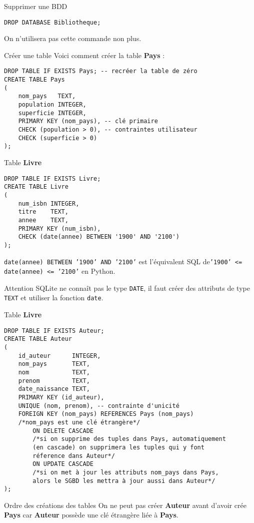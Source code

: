 \documentclass[10pt]{nsibeamer}
\begin{document}
\begin{frame}[fragile]{Supprimer une BDD}
    
    \begin{verbatim}
DROP DATABASE Bibliotheque;
	\end{verbatim}
    \pause
    On n'utilisera pas cette commande non plus.
\end{frame}

\begin{frame}[fragile]{Créer une table}
    Voici comment créer la table \textbf{Pays} :
    
    \begin{verbatim}
DROP TABLE IF EXISTS Pays; -- recréer la table de zéro
CREATE TABLE Pays
(
    nom_pays   TEXT,
    population INTEGER,
    superficie INTEGER,
    PRIMARY KEY (nom_pays), -- clé primaire
    CHECK (population > 0), -- contraintes utilisateur
    CHECK (superficie > 0)
);
\end{verbatim}
    
\end{frame}

\begin{frame}[fragile]{Table \textbf{Livre}}
    
    
    \begin{verbatim}
DROP TABLE IF EXISTS Livre;
CREATE TABLE Livre
(
    num_isbn INTEGER,
    titre    TEXT,
    annee    TEXT,
    PRIMARY KEY (num_isbn),
    CHECK (date(annee) BETWEEN '1900' AND '2100')
);
\end{verbatim}
    \pause
    \texttt{date(annee) BETWEEN '1900' AND '2100'} est l'équivalent SQL de\texttt{'1900' <= date(annee) <= '2100'} en Python.\pause
    \begin{alertblock}{Attention}
        SQLite ne connaît pas le type \texttt{DATE}, il faut créer des attributs de type \texttt{TEXT} et utiliser la fonction \texttt{date}.
    \end{alertblock}
\end{frame}
\begin{frame}[fragile]{Table \textbf{Livre}}
    \begin{verbatim}
DROP TABLE IF EXISTS Auteur;
CREATE TABLE Auteur
(
    id_auteur      INTEGER,
    nom_pays       TEXT,
    nom            TEXT,
    prenom         TEXT,
    date_naissance TEXT,
    PRIMARY KEY (id_auteur),
    UNIQUE (nom, prenom), -- contrainte d'unicité
    FOREIGN KEY (nom_pays) REFERENCES Pays (nom_pays)
    /*nom_pays est une clé étrangère*/
        ON DELETE CASCADE
        /*si on supprime des tuples dans Pays, automatiquement
        (en cascade) on supprimera les tuples qui y font
        réference dans Auteur*/
        ON UPDATE CASCADE
        /*si on met à jour les attributs nom_pays dans Pays,
        alors le SGBD les mettra à jour aussi dans Auteur*/
);\end{verbatim}
\end{frame}
\begin{frame}{Ordre des créations des tables}
    On ne peut pas créer \textbf{Auteur} avant d'avoir crée \textbf{Pays} car \textbf{Auteur} possède une clé étrangère liée à \textbf{Pays}.
\end{frame}
\end{document}
